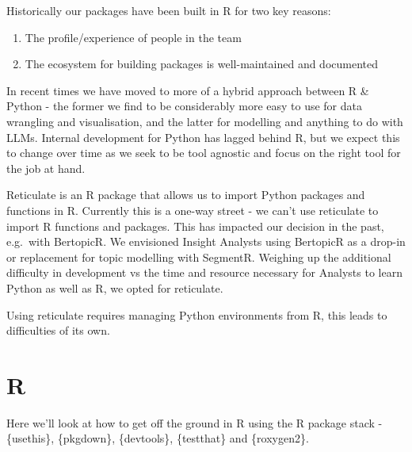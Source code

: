 \documentclass[
  letterpaper,
  DIV=11,
  numbers=noendperiod]{scrreprt}
\providecommand{\tightlist}{%
  \setlength{\itemsep}{0pt}\setlength{\parskip}{0pt}}\usepackage{longtable,booktabs,array}
\begin{document}
Historically our packages have been built in R for two key reasons:

\begin{enumerate}
\def\labelenumi{\arabic{enumi}.}
\tightlist
\item
  The profile/experience of people in the team
\item
  The ecosystem for building packages is well-maintained and documented
\end{enumerate}

In recent times we have moved to more of a hybrid approach between R \&
Python - the former we find to be considerably more easy to use for data
wrangling and visualisation, and the latter for modelling and anything
to do with LLMs. Internal development for Python has lagged behind R,
but we expect this to change over time as we seek to be tool agnostic
and focus on the right tool for the job at hand.

\begin{tcolorbox}[enhanced jigsaw, colback=white, opacitybacktitle=0.6, coltitle=black, left=2mm, breakable, bottomtitle=1mm, toptitle=1mm, toprule=.15mm, colframe=quarto-callout-note-color-frame, titlerule=0mm, title=\textcolor{quarto-callout-note-color}{\faInfo}\hspace{0.5em}{Reticulate}, colbacktitle=quarto-callout-note-color!10!white, rightrule=.15mm, bottomrule=.15mm, arc=.35mm, opacityback=0, leftrule=.75mm]

Reticulate is an R package that allows us to import Python packages and
functions in R. Currently this is a one-way street - we can't use
reticulate to import R functions and packages. This has impacted our
decision in the past, e.g.~with BertopicR. We envisioned Insight
Analysts using BertopicR as a drop-in or replacement for topic modelling
with SegmentR. Weighing up the additional difficulty in development vs
the time and resource necessary for Analysts to learn Python as well as
R, we opted for reticulate.

Using reticulate requires managing Python environments from R, this
leads to difficulties of its own.

\end{tcolorbox}

\chapter{R}\label{r}

Here we'll look at how to get off the ground in R using the R package
stack - \{usethis\}, \{pkgdown\}, \{devtools\}, \{testthat\} and
\{roxygen2\}.
\end{document}
